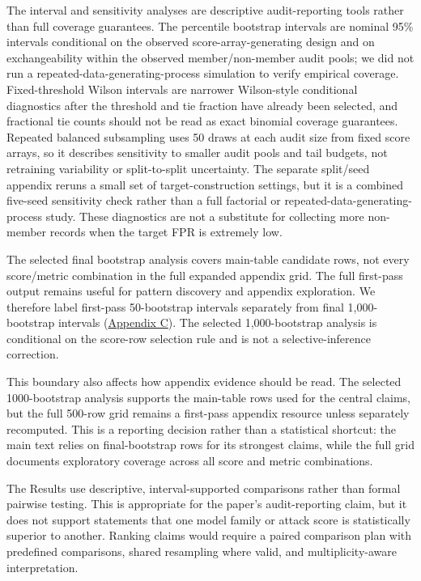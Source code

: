 \documentclass[
  10pt,
  twocolumn]{article}
\begin{document}
The interval and sensitivity analyses are descriptive audit-reporting tools rather than full coverage guarantees. The percentile bootstrap intervals are nominal 95\% intervals conditional on the observed score-array-generating design and on exchangeability within the observed member/non-member audit pools; we did not run a repeated-data-generating-process simulation to verify empirical coverage. Fixed-threshold Wilson intervals are narrower Wilson-style conditional diagnostics after the threshold and tie fraction have already been selected, and fractional tie counts should not be read as exact binomial coverage guarantees. Repeated balanced subsampling uses 50 draws at each audit size from fixed score arrays, so it describes sensitivity to smaller audit pools and tail budgets, not retraining variability or split-to-split uncertainty. The separate split/seed appendix reruns a small set of target-construction settings, but it is a combined five-seed sensitivity check rather than a full factorial or repeated-data-generating-process study. These diagnostics are not a substitute for collecting more non-member records when the target FPR is extremely low.

The selected final bootstrap analysis covers main-table candidate rows, not every score/metric combination in the full expanded appendix grid. The full first-pass output remains useful for pattern discovery and appendix exploration. We therefore label first-pass 50-bootstrap intervals separately from final 1,000-bootstrap intervals (\protect\hyperlink{appendix-c-final-bootstrap-boundary}{Appendix C}). The selected 1,000-bootstrap analysis is conditional on the score-row selection rule and is not a selective-inference correction.

This boundary also affects how appendix evidence should be read. The selected 1000-bootstrap analysis supports the main-table rows used for the central claims, but the full 500-row grid remains a first-pass appendix resource unless separately recomputed. This is a reporting decision rather than a statistical shortcut: the main text relies on final-bootstrap rows for its strongest claims, while the full grid documents exploratory coverage across all score and metric combinations.

The Results use descriptive, interval-supported comparisons rather than formal pairwise testing. This is appropriate for the paper's audit-reporting claim, but it does not support statements that one model family or attack score is statistically superior to another. Ranking claims would require a paired comparison plan with predefined comparisons, shared resampling where valid, and multiplicity-aware interpretation.
\end{document}
